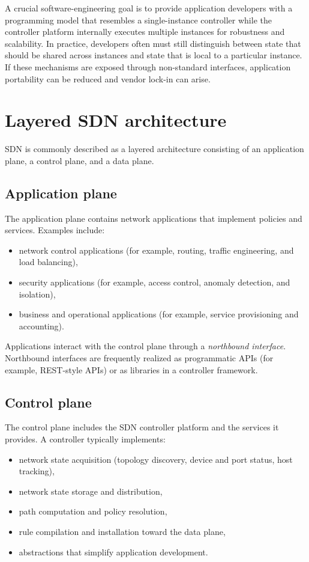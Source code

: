\documentclass[11pt,a4paper,openany]{report}
\begin{document}
A crucial software-engineering goal is to provide application developers with a programming model that resembles a single-instance controller while the controller platform internally executes multiple instances for robustness and scalability. In practice, developers often must still distinguish between state that should be shared across instances and state that is local to a particular instance. If these mechanisms are exposed through non-standard interfaces, application portability can be reduced and vendor lock-in can arise.

\section{Layered SDN architecture}

SDN is commonly described as a layered architecture consisting of an application plane, a control plane, and a data plane.

\subsection{Application plane}

The application plane contains network applications that implement policies and services. Examples include:

\begin{itemize}
\item network control applications (for example, routing, traffic engineering, and load balancing),
\item security applications (for example, access control, anomaly detection, and isolation),
\item business and operational applications (for example, service provisioning and accounting).
\end{itemize}

Applications interact with the control plane through a \emph{northbound interface}. Northbound interfaces are frequently realized as programmatic APIs (for example, REST-style APIs) or as libraries in a controller framework.

\subsection{Control plane}

The control plane includes the SDN controller platform and the services it provides. A controller typically implements:

\begin{itemize}
\item network state acquisition (topology discovery, device and port status, host tracking),
\item network state storage and distribution,
\item path computation and policy resolution,
\item rule compilation and installation toward the data plane,
\item abstractions that simplify application development.
\end{itemize}
\end{document}
